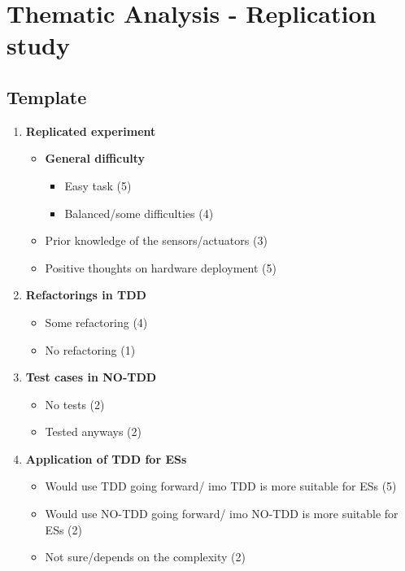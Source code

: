 \chapter{Thematic Analysis - Replication study}

\section{Template}
\begin{enumerate}
    \item \textbf{Replicated experiment}
    \begin{itemize}
        \item \textbf{General difficulty}
        \begin{itemize}
            \item Easy task (5)
            \item Balanced/some difficulties (4)
        \end{itemize}
        \item Prior knowledge of the sensors/actuators (3)
        \item Positive thoughts on hardware deployment (5)
    \end{itemize}

    \item \textbf{Refactorings in TDD}
    \begin{itemize}
        \item Some refactoring (4)
        \item No refactoring (1)
    \end{itemize}

    \item \textbf{Test cases in NO-TDD}
    \begin{itemize}
        \item No tests (2)
        \item Tested anyways (2)
    \end{itemize}

    \item \textbf{Application of TDD for ESs}
    \begin{itemize}
        \item Would use TDD going forward/ imo TDD is more suitable for ESs (5)
        \item Would use NO-TDD going forward/ imo NO-TDD is more suitable for ESs (2)
        \item Not sure/depends on the complexity (2)
    \end{itemize}


\end{enumerate}
